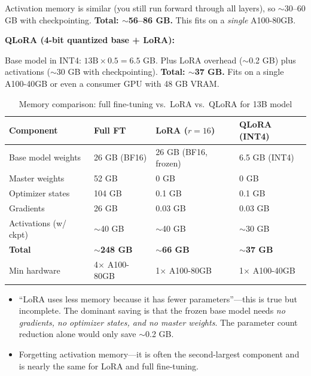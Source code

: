 \begin{interviewq}
Activation memory is similar (you still run forward through all layers), so $\sim$30--60 GB with checkpointing. \textbf{Total: $\sim$56--86 GB.} This fits on a \textit{single} A100-80GB.

\textbf{QLoRA (4-bit quantized base + LoRA):}

Base model in INT4: $13\text{B} \times 0.5 = 6.5$ GB. Plus LoRA overhead ($\sim$0.2 GB) plus activations ($\sim$30 GB with checkpointing). \textbf{Total: $\sim$37 GB.} Fits on a single A100-40GB or even a consumer GPU with 48 GB VRAM.

\begin{table}[H]
\centering
\caption{Memory comparison: full fine-tuning vs.\ LoRA vs.\ QLoRA for 13B model}
\begin{tabularx}{\textwidth}{lXXX}
\toprule
\textbf{Component} & \textbf{Full FT} & \textbf{LoRA ($r=16$)} & \textbf{QLoRA (INT4)} \\
\midrule
Base model weights & 26 GB (BF16) & 26 GB (BF16, frozen) & 6.5 GB (INT4) \\
Master weights & 52 GB & 0 GB & 0 GB \\
Optimizer states & 104 GB & 0.1 GB & 0.1 GB \\
Gradients & 26 GB & 0.03 GB & 0.03 GB \\
Activations (w/ ckpt) & $\sim$40 GB & $\sim$40 GB & $\sim$30 GB \\
\midrule
\textbf{Total} & \textbf{$\sim$248 GB} & \textbf{$\sim$66 GB} & \textbf{$\sim$37 GB} \\
Min hardware & 4$\times$ A100-80GB & 1$\times$ A100-80GB & 1$\times$ A100-40GB \\
\bottomrule
\end{tabularx}
\end{table}

\redflags
\begin{itemize}
    \item ``LoRA uses less memory because it has fewer parameters''---this is true but incomplete. The dominant saving is that the frozen base model needs \textit{no gradients, no optimizer states, and no master weights}. The parameter count reduction alone would only save $\sim$0.2 GB.
    \item Forgetting activation memory---it is often the second-largest component and is nearly the same for LoRA and full fine-tuning.
\end{itemize}



\end{interviewq}
